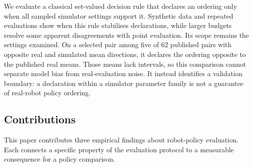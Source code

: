 \documentclass[pdflatex,iicol,sn-apa]{sn-jnl}
\theoremstyle{remark}
\begin{document}
We evaluate a classical set-valued decision rule that declares an ordering only when all sampled
simulator settings support it. Synthetic data and repeated evaluations show when this rule
stabilises declarations, while larger budgets resolve some apparent disagreements with point
evaluation. Its scope remains the settings examined. On a selected pair among five of 62 published
pairs with opposite real and simulated mean directions, it declares the ordering opposite to the
published real means. Those means lack intervals, so this comparison cannot separate model bias
from real-evaluation noise. It instead identifies a validation boundary: a declaration within a
simulator parameter family is not a guarantee of real-robot policy ordering.

\subsection{Contributions}\label{subsec1_1}

This paper contributes three empirical findings about robot-policy evaluation. Each connects a
specific property of the evaluation protocol to a measurable consequence for a policy comparison.
\end{document}
